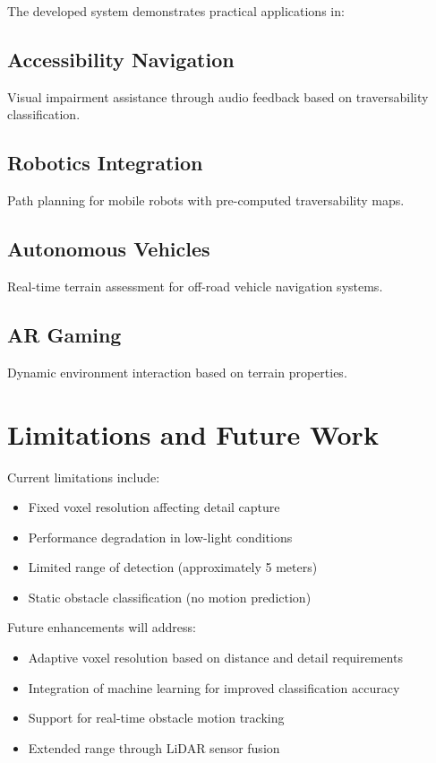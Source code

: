 \documentclass[conference]{IEEEtran}
\begin{document}
The developed system demonstrates practical applications in:

\subsection{Accessibility Navigation}
Visual impairment assistance through audio feedback based on traversability classification.

\subsection{Robotics Integration}
Path planning for mobile robots with pre-computed traversability maps.

\subsection{Autonomous Vehicles}
Real-time terrain assessment for off-road vehicle navigation systems.

\subsection{AR Gaming}
Dynamic environment interaction based on terrain properties.

\section{Limitations and Future Work}

Current limitations include:
\begin{itemize}
    \item Fixed voxel resolution affecting detail capture
    \item Performance degradation in low-light conditions
    \item Limited range of detection (approximately 5 meters)
    \item Static obstacle classification (no motion prediction)
\end{itemize}

Future enhancements will address:
\begin{itemize}
    \item Adaptive voxel resolution based on distance and detail requirements
    \item Integration of machine learning for improved classification accuracy
    \item Support for real-time obstacle motion tracking
    \item Extended range through LiDAR sensor fusion
\end{itemize}
\end{document}
